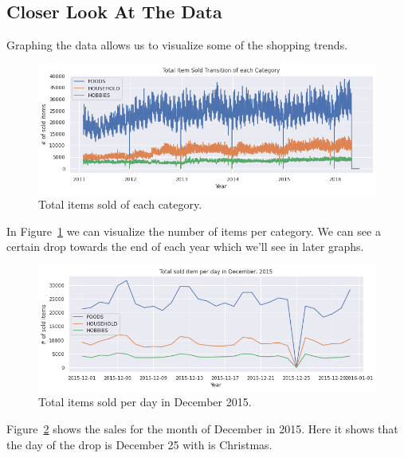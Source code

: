 \documentclass[10pt,twocolumn,letterpaper]{article}
\begin{document}
\subsection{Closer Look At The Data}
  Graphing the data allows us to visualize some of the shopping trends.

\begin{figure}
  \begin{center}
    \includegraphics[width=0.8\linewidth]{img/totalItemSoldofEachCategory.png}
  \end{center}
  \caption{Total items sold of each category.}
  \label{fig:totalItemSoldofEachCategory}
\end{figure}
  In Figure~\ref{fig:totalItemSoldofEachCategory} we can visualize the number of
  items per category. We can see a certain drop towards the end of each year
  which we'll see in later graphs.

\begin{figure}
  \begin{center}
    \includegraphics[width=0.8\linewidth]{img/totalSoldItemPerDayDec2015.png}
  \end{center}
    \caption{Total items sold per day in December 2015.}
  \label{fig:totalSoldItemPerDayDec2015}
\end{figure}
  Figure~\ref{fig:totalSoldItemPerDayDec2015} shows the sales for the month of
  December in 2015. Here it shows that the day of the drop is December 25 with
  is Christmas.
\end{document}
